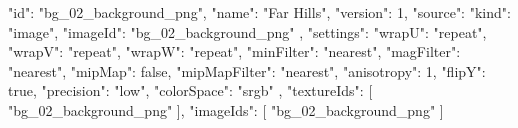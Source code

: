 {
  "id": "bg_02_background_png",
  "name": "Far Hills",
  "version": 1,
  "source": {
    "kind": "image",
    "imageId": "bg_02_background_png"
  },
  "settings": {
    "wrapU": "repeat",
    "wrapV": "repeat",
    "wrapW": "repeat",
    "minFilter": "nearest",
    "magFilter": "nearest",
    "mipMap": false,
    "mipMapFilter": "nearest",
    "anisotropy": 1,
    "flipY": true,
    "precision": "low",
    "colorSpace": "srgb"
  },
  "textureIds": [
    "bg_02_background_png"
  ],
  "imageIds": [
    "bg_02_background_png"
  ]
}
